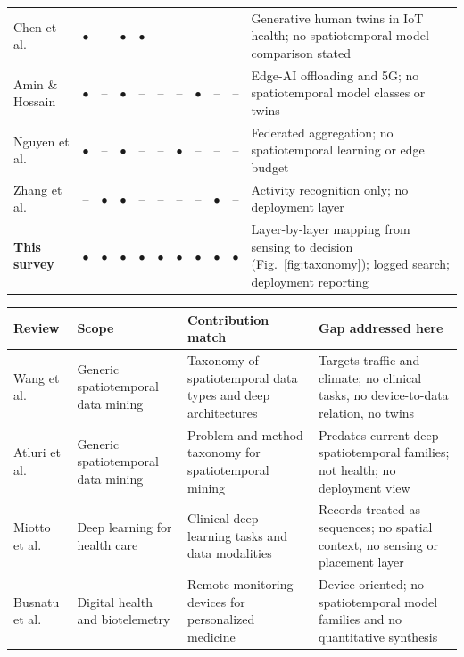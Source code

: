 \documentclass[journal]{IEEEtran}
\begin{document}
\begin{table}[t]
\begin{tabularx}{\textwidth}{>{\raggedright\arraybackslash}p{2.7cm} c c c c c c c c c >{\raggedright\arraybackslash}X}
\addlinespace[1pt]
Chen et al.~\cite{chen2024genaitwin} & $\bullet$ & -- & $\bullet$ & $\bullet$ & -- & -- & -- & -- & -- & Generative human twins in IoT health; no spatiotemporal model comparison stated \\
\addlinespace[1pt]
Amin \& Hossain~\cite{amin2021edgeintel} & $\bullet$ & -- & $\bullet$ & -- & -- & -- & $\bullet$ & -- & -- & Edge-AI offloading and 5G; no spatiotemporal model classes or twins \\
\addlinespace[1pt]
Nguyen et al.~\cite{nguyen2022FLsmarthealthcare} & $\bullet$ & -- & $\bullet$ & -- & -- & $\bullet$ & -- & -- & -- & Federated aggregation; no spatiotemporal learning or edge budget \\
\addlinespace[1pt]
Zhang et al.~\cite{zhang2022harreview} & -- & $\bullet$ & $\bullet$ & -- & -- & -- & -- & $\bullet$ & -- & Activity recognition only; no deployment layer \\
\addlinespace[1pt]
\textbf{This survey} & $\bullet$ & $\bullet$ & $\bullet$ & $\bullet$ & $\bullet$ & $\bullet$ & $\bullet$ & $\bullet$ & $\bullet$ & Layer-by-layer mapping from sensing to decision (Fig.~\ref{fig:taxonomy}); logged search; deployment reporting \\
\bottomrule
\end{tabularx}
\else
\footnotesize
\setlength{\tabcolsep}{4pt}
\renewcommand{\arraystretch}{1.1}
\begin{tabularx}{\textwidth}{>{\raggedright\arraybackslash}p{2.5cm} >{\raggedright\arraybackslash}p{2.6cm} >{\raggedright\arraybackslash}X >{\raggedright\arraybackslash}X}
\toprule
\textbf{Review} & \textbf{Scope} & \textbf{Contribution match} & \textbf{Gap addressed here} \\
\midrule
Wang et al.~\cite{wang2022deep} & Generic spatiotemporal data mining & Taxonomy of spatiotemporal data types and deep architectures & Targets traffic and climate; no clinical tasks, no device-to-data relation, no twins \\
\addlinespace[2pt]
Atluri et al.~\cite{atluri2018stdm} & Generic spatiotemporal data mining & Problem and method taxonomy for spatiotemporal mining & Predates current deep spatiotemporal families; not health; no deployment view \\
\addlinespace[2pt]
Miotto et al.~\cite{miotto2018deeplearning} & Deep learning for health care & Clinical deep learning tasks and data modalities & Records treated as sequences; no spatial context, no sensing or placement layer \\
\addlinespace[2pt]
Busnatu et al.~\cite{Busnatu2022} & Digital health and biotelemetry & Remote monitoring devices for personalized medicine & Device oriented; no spatiotemporal model families and no quantitative synthesis \\

\end{tabularx}
\end{table}
\end{document}
